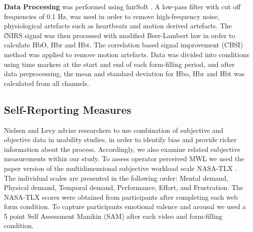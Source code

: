 \documentclass[../main/Feedback.tex]{subfiles}
\begin{document}
\textbf{Data Processing} was performed using fnirSoft \cite{ayazfunctional}.
A low-pass filter with cut off frequencies of 0.1 Hz, was used in order to remove high-frequency noise, physiological artefacts such as heartbeats and motion derived artefacts.
The fNIRS signal was then processed with modified Beer-Lambert law \cite{cope1988system} in order to calculate HbO, Hbr and Hbt.
The correlation based signal improvement (CBSI) \cite{cui2010functional} method was applied to remove motion artefacts. 
Data was divided into conditions using time markers at the start and end of each form-filling period, and
after data preprocessing, the mean and standard deviation for Hbo, Hbr and Hbt was calculated from all channels.


\subsection{Self-Reporting Measures}
Nielsen and Levy \cite{nielsen1994measuring} advise researchers to use combination of subjective and objective data in usability studies, in order to identify bias and provide richer information about the process. Accordingly, we also examine related subjective measurements within our study. To assess operator perceived MWL we used the paper version of the multidimensional subjective workload scale NASA-TLX \cite{nasatlx}.
The individual scales are presented in the following order: Mental demand, Physical demand, Temporal demand, Performance, Effort, and Frustration.
The NASA-TLX scores were obtained from participants after completing each web form condition. To capture participants emotional valence and arousal we used a 5 point Self Assessment Manikin (SAM) \cite{bradley1994measuring} after each video and form-filling condition.
\end{document}
